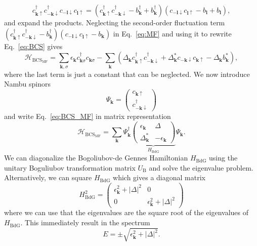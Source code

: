 \begin{equation}
c_{\bm{k}\uparrow}^{\dagger}c_{-\bm{k}\downarrow}^{\dagger}c_{-\bm{l}\downarrow}c_{\bm{l}\uparrow}=\left(c_{\bm{k}\uparrow}^{\dagger}c_{-\bm{k}\downarrow}^{\dagger}-b_{\bm{k}}^{\dagger}+b_{\bm{k}}^{\dagger}\right)\left(c_{-\bm{l}\downarrow}c_{\bm{l}\uparrow}-b_{\bm{l}}+b_{\bm{l}}\right),\label{eq:MF}
\end{equation}
and expand the products.
Neglecting the second-order fluctuation term  $\left(c_{\bm{k}\uparrow}^{\dagger}c_{-\bm{k}\downarrow}^{\dagger}-b_{\bm{k}}^{\dagger}\right)\left(c_{-\bm{l}\downarrow}c_{\bm{l}\uparrow}-b_{\bm{k}}\right)$ in Eq.~\ref{eq:MF} and using it to rewrite Eq.~\ref{eq:BCS} gives
\begin{equation}
\mathcal{H}_{\textrm{BCS}_{\textrm{MF}}}=\underset{\bm{k},\sigma}{\sum}\epsilon_{\bm{k}}c_{\bm{k}\sigma}^{\dagger}c_{\bm{k}\sigma}-\underset{\bm{k}}{\sum}\left(\Delta_{\bm{k}}c_{\bm{k}\uparrow}^{\dagger}c_{-\bm{k}\downarrow}^{\dagger}+\Delta_{\bm{k}}^{*}c_{-\bm{k}\downarrow}c_{\bm{k}\uparrow}-\Delta_{\bm{k}}b_{\bm{k}}^{*}\right),\label{eq:BCS_MF}
\end{equation}
where the last term is just a constant that can be neglected.
We now introduce Nambu spinors
\begin{equation}
\Psi_{\bm{k}}=\left(\begin{array}{c}
c_{\bm{k}\uparrow}\\
c_{-\bm{k}\downarrow}^{\dagger}
\end{array}\right)\label{eq:Nambu}
\end{equation}
and write Eq.~\ref{eq:BCS_MF} in matrix representation
\[
\mathcal{H}_{\textrm{BCS}_{\textrm{MF}}}=\underset{\bm{k}}{\sum}\Psi_{\bm{k}}^{\dagger}\underset{H_{\textrm{BdG}}}{\underbrace{\left(\begin{array}{cc}
\epsilon_{\bm{k}} & \Delta\\
\Delta_{\bm{k}}^{*} & -\epsilon_{\bm{k}}
\end{array}\right)}}\Psi_{\bm{k}}.
\]
We can diagonalize the Bogoliubov-de Gennes Hamiltonian $H_{\textrm{BdG}}$ using the unitary Boguliubov transformation matrix $U_{\textrm{B}}$ and solve the eigenvalue problem.
Alternatively, we can square $H_{\textrm{BdG}}$ which gives a diagonal matrix
\[
H_{\textrm{BdG}}^{2}=\left(\begin{array}{cc}
\epsilon_{\bm{k}}^{2}+\left|\Delta\right|^{2} & 0\\
0 & \epsilon_{\bm{k}}^{2}+\left|\Delta\right|^{2}
\end{array}\right)
\]
where we can use that the eigenvalues are the square root of the eigenvalues of $H_{\textrm{BdG}}$.
This immediately result in the spectrum
\begin{equation}
E=\pm\sqrt{\epsilon_{\bm{k}}^{2}+\left|\Delta\right|^{2}}.\label{eq:SC_spectrum}
\end{equation}

